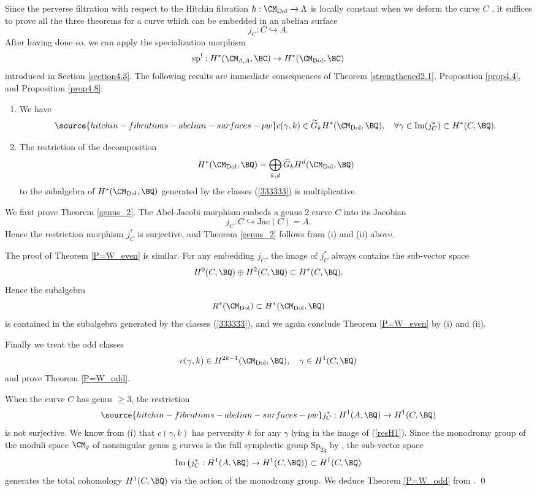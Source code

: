 Since the perverse filtration with respect to the Hitchin fibration $h: \CM_{\mathrm{Dol}} \to \Lambda$ is locally constant when we deform the curve $C$ \cite{dCM}, it suffices to prove all the three theorems for a curve which can be embedded in an abelian surface
\[
j_C: C\hookrightarrow A.
\]
After having done so,  we can apply the specialization morphism
\[
\mathrm{sp}^!: H^*(\CM_{\beta, A}, \BC) \to H^*(\CM_{\mathrm{Dol}}, \BC)
\]
introduced in Section \ref{section4.3}. The following results are immediate consequences of  Theorem \ref{strengthened2.1}, Proposition \ref{prop4.4}, and Proposition \ref{prop4.8}:
\begin{enumerate}
    \item[(i)] We have
    \begin{equation}\label{333333}
\source{hitchin-fibrations-abelian-surfaces-pw}
    c(\gamma, k) \in \widetilde{G}_kH^*(\CM_{\mathrm{Dol}}, \BQ), \quad \forall \gamma \in \mathrm{Im}({j_C^*}) \subset H^*(C, \BQ).
    \end{equation}
    \item[(ii)] The restriction of the decomposition \[
    H^*(\CM_{\mathrm{Dol}}, \BQ)= \bigoplus_{k,d}\widetilde{G}_kH^d(\CM_{\mathrm{Dol}}, \BQ)
    \]to the subalgebra of $H^*(\CM_{\mathrm{Dol}}, \BQ)$ generated by the classes (\ref{333333}) is multiplicative.
\end{enumerate}

We first prove Theorem \ref{genus_2}. The Abel-Jacobi morphism embeds a genus 2 curve $C$ into its Jacobian
\[
j_C: C \hookrightarrow \mathrm{Jac}(C) = A.
\]
Hence the restriction morphism $j_C^*$ is surjective, and Theorem \ref{genus_2} follows from (i) and (ii) above.

The proof of Theorem \ref{P=W_even} is similar. For any embedding $j_C$, the image of $j_C^*$ always contains the sub-vector space
\[
H^0(C, \BQ) \oplus H^2(C, \BQ) \subset H^*(C, \BQ).
\]
Hence the subalgebra
\[
R^*(\CM_{\mathrm{Dol}}) \subset H^*(\CM_{\mathrm{Dol}}, \BQ)
\]
is contained in the subalgebra generated by the classes (\ref{333333}), and we again conclude Theorem \ref{P=W_even} by (i) and (ii).

Finally we treat the odd classes
\[
c(\gamma, k) \in H^{2k-1}(\CM_{\mathrm{Dol}}, \BQ), \quad \gamma\in H^1(C, \BQ)
\]
and prove Theorem \ref{P=W_odd}.

When the curve $C$ has genus $\geq 3$, the restriction
\begin{equation}\label{resH1}
\source{hitchin-fibrations-abelian-surfaces-pw}
j_C^*: H^1(A, \BQ) \to H^1(C, \BQ)
\end{equation}
is not surjective. We know from (i) that $c(\gamma, k)$ has perversity $k$ for any $\gamma$ lying in the image of (\ref{resH1}). Since the monodromy group of the moduli space $\CM_g$ of nonsingular genus g curves is the full symplectic group $\mathrm{Sp}_{2g}$ by \cite{A}, the sub-vector space
\[
\mathrm{Im}\left({j_C^*}:H^1(A, \BQ)\to H^1(C,\BQ) \right) \subset H^1(C, \BQ)
\]
generates the total cohomology $H^1(C, \BQ)$ via the action of the monodromy group. We deduce Theorem \ref{P=W_odd} from \cite{dCM}. \qed








